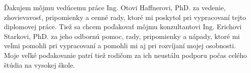 Ďakujem môjmu vedúcemu práce Ing. Otovi Haffnerovi, PhD. za vedenie, zhovievavosť, pripomienky a cenné rady, ktoré mi poskytol pri vypracovaní tejto diplomovej práce. Tiež sa chcem poďakovať môjmu konzultantovi Ing. Erichovi Starkovi, PhD. za jeho odbornú pomoc, rady, pripomienky a nápady, ktoré mi veľmi pomohli pri vypracovaní a pomohli mi aj pri rozvíjaní mojej osobnosti. Moje veľké poďakovanie patrí tiež rodičom za ich neustálu podporu počas celého štúdia na vysokej škole.